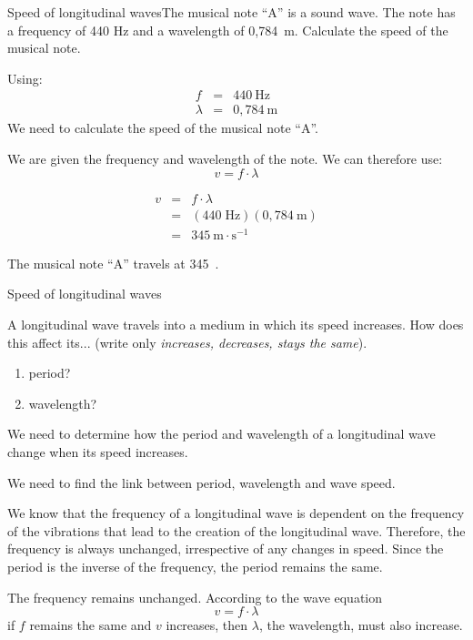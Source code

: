 \begin{wex}
{Speed of longitudinal waves}{The musical note ``A'' is a sound wave. The note has a frequency of 440 Hz and a wavelength of 0,784~m. Calculate the speed of the musical note.}{
Using:
\begin{eqnarray*}
f &=& 440 \ \text{Hz} \\
\lambda &=& 0,784\ \text{m}
\end{eqnarray*}
We need to calculate the speed of the musical note ``A''.

We are given the frequency and wavelength of the note. We can therefore use:
\begin{equation*}
v=f\cdot \lambda 
\end{equation*}

\begin{eqnarray*}
v&=&f\cdot \lambda\\
&=&(440\;\text{Hz})(0,784~\text{m})\\
&=&345~\text{m}\cdot\text{s}^{-1}
\end{eqnarray*}

The musical note ``A'' travels at 345~\ms.
}
\end{wex}

\begin{wex}
{Speed of longitudinal waves}{A longitudinal wave travels into a medium in which its speed increases.
How does this affect its... (write only \emph{increases, decreases, stays the same}).
\begin{enumerate}[noitemsep, label=\textbf{\arabic*}. ]\item period?
\item wavelength?
\end{enumerate}
}{
We need to determine how the period and wavelength of a longitudinal wave change when its speed increases.

We need to find the link between period, wavelength and wave speed.

We know that the frequency of a longitudinal wave is dependent on the frequency of the vibrations that lead to the creation of the longitudinal wave. Therefore, the frequency is always unchanged, irrespective of any changes in speed. Since the period is the inverse of the frequency, the period remains the same.

The frequency remains unchanged. According to the wave equation
\begin{equation*}
v = f\cdot\lambda
\end{equation*}
if $f$ remains the same and $v$ increases, then $\lambda$, the wavelength, must also increase.
}
\end{wex}

